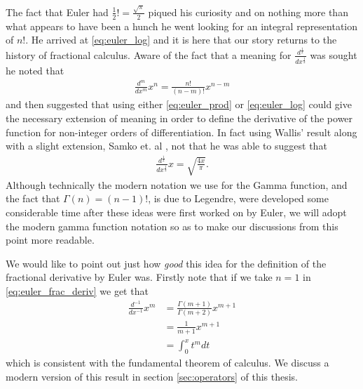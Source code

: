 The fact that Euler had $ \frac{1}{2} ! = \frac{\sqrt{\pi}}{2} $ piqued his curiosity and on nothing more than what appears to have been a hunch he went looking for an integral representation of $ n! $\cite{Davis1959}.
He arrived at \eqref{eq:euler_log} and it is here that our story returns to the history of fractional calculus. Aware of the fact that a meaning for $ \frac{d^\frac{1}{2}}{dx^\frac{1}{2}} $ was sought he noted that
\begin{align}
    \label{eq:euler_frac_deriv}
    \frac{d^m}{dx^m} x^n = \frac{n!}{(n-m)!}x^{n-m}
\end{align}
and then suggested that using either \eqref{eq:euler_prod} or \eqref{eq:euler_log} could give the necessary extension of meaning in order to define the derivative of the power function for non-integer orders of differentiation. In fact using Wallis' result along with a slight extension, Samko et. al \cite{Davis1959}, not that he was able to suggest that
\begin{align}
    \frac{d^\frac{1}{2}}{dx^\frac{1}{2}} x = \sqrt{\frac{4x}{\pi}}.
\end{align}
Although technically the modern notation we use for the Gamma function, and the fact that $ \Gamma(n) = (n-1)! $, is due to Legendre, were developed some considerable time after these ideas were first worked on by Euler, we will adopt the modern gamma function notation so as to make our discussions from this point more readable.

We would like to point out just how \emph{good} this idea for the definition of the fractional derivative by Euler was.
Firstly note that if we take $ n = 1 $ in \eqref{eq:euler_frac_deriv} we get that
\begin{align}
    \frac{d^{-1}}{dx^{-1}} x^m &= \frac{\Gamma(m+1)}{\Gamma(m+2)} x^{m+1} \\
    &= \frac{1}{m+1} x^{m+1} \\
    &= \int_0^x t^m dt
\end{align} 
which is consistent with the fundamental theorem of calculus. We discuss a modern version of this result in section \ref{sec:operators} of this thesis. 

